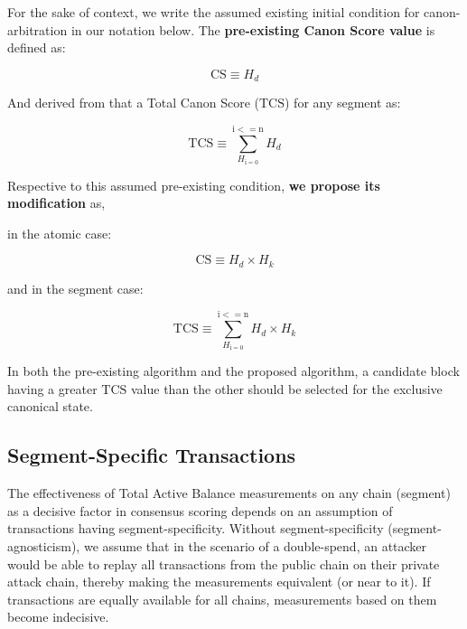 \documentclass[11pt]{article}
\theoremstyle{plain}
\begin{document}
For the sake of context, we write the assumed existing initial condition for
canon-arbitration in our notation below. The \textbf{pre-existing Canon Score value} is defined as:

\begin{equation}
\mathrm{CS} \equiv H_d
\end{equation}

And derived from that a Total Canon Score ($\mathrm{TCS}$) for any segment as:

\begin{equation}
\mathrm{TCS} \equiv \sum_{H_\mathrm{i = 0}}^{\mathrm{i <= n}} H_d
\end{equation}

Respective to this assumed pre-existing condition, \textbf{we propose its modification} as,

in the atomic case:

\begin{equation}
\mathrm{CS} \equiv H_d \times H_k
\end{equation}

and in the segment case:

\begin{equation}
\mathrm{TCS} \equiv \sum_{H_\mathrm{i = 0}}^{\mathrm{i <= n}} H_d \times H_k
\end{equation}

In both the pre-existing algorithm and the proposed algorithm, a candidate
block having a greater $\mathrm{TCS}$ value than the other should be selected for
the exclusive canonical state.

\subsection{\small{Segment-Specific Transactions}}\label{subsec:small{segment-specific-transactions}}

The effectiveness of Total Active Balance measurements on any chain (segment)
as a decisive factor in consensus scoring depends on an assumption of transactions having
segment-specificity.
Without segment-specificity (segment-agnosticism), we assume that in the scenario of a double-spend,
an attacker would be able to replay all transactions from the public chain on their private
attack chain, thereby making the measurements equivalent (or near to it).
If transactions are equally available for all chains, measurements based on them become indecisive.
\end{document}
